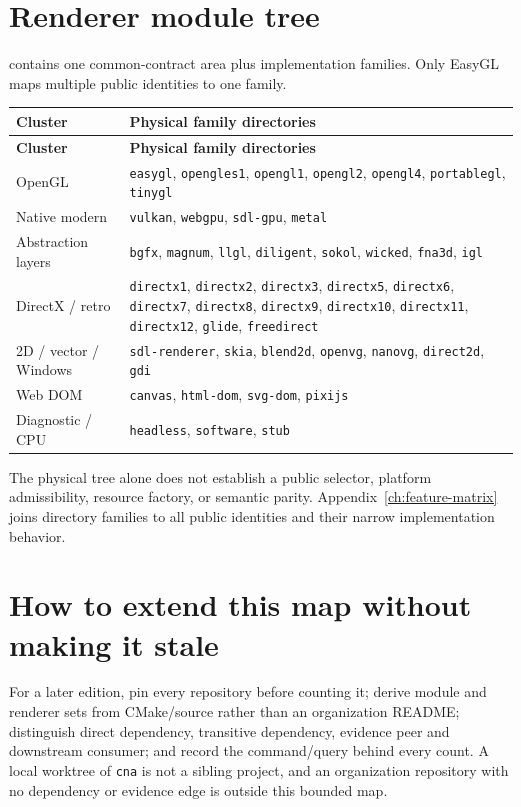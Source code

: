 \section{Renderer module tree}

 contains one common-contract area plus
\RendererFamilyCount{} implementation families.
Only EasyGL maps multiple public identities to one family.

\begin{small}
\begin{longtable}{>{\raggedright\arraybackslash}p{3.2cm}>{\raggedright\arraybackslash}p{8.2cm}}
\toprule
\textbf{Cluster} & \textbf{Physical family directories} \\
\midrule
\endfirsthead
\toprule
\textbf{Cluster} & \textbf{Physical family directories} \\
\midrule
\endhead
OpenGL & \texttt{easygl}, \texttt{opengles1}, \texttt{opengl1}, \texttt{opengl2},
  \texttt{opengl4}, \texttt{portablegl}, \texttt{tinygl} \\
Native modern & \texttt{vulkan}, \texttt{webgpu}, \texttt{sdl-gpu}, \texttt{metal} \\
Abstraction layers & \texttt{bgfx}, \texttt{magnum}, \texttt{llgl}, \texttt{diligent},
  \texttt{sokol}, \texttt{wicked}, \texttt{fna3d}, \texttt{igl} \\
DirectX / retro & \texttt{directx1}, \texttt{directx2}, \texttt{directx3},
  \texttt{directx5}, \texttt{directx6}, \texttt{directx7}, \texttt{directx8},
  \texttt{directx9}, \texttt{directx10}, \texttt{directx11}, \texttt{directx12},
  \texttt{glide}, \texttt{freedirect} \\
2D / vector / Windows & \texttt{sdl-renderer}, \texttt{skia}, \texttt{blend2d},
  \texttt{openvg}, \texttt{nanovg}, \texttt{direct2d}, \texttt{gdi} \\
Web DOM & \texttt{canvas}, \texttt{html-dom}, \texttt{svg-dom}, \texttt{pixijs} \\
Diagnostic / CPU & \texttt{headless}, \texttt{software}, \texttt{stub} \\
\bottomrule
\end{longtable}
\end{small}

The physical tree alone does not establish a public selector, platform admissibility, resource
factory, or semantic parity.  Appendix~\ref{ch:feature-matrix} joins directory families to all
\RendererIdentityCount{} public identities and their narrow implementation behavior.

\section{How to extend this map without making it stale}

For a later edition, pin every repository before counting it; derive module and renderer sets
from CMake/source rather than an organization README; distinguish direct dependency, transitive
dependency, evidence peer and downstream consumer; and record the command/query behind every
count.  A local worktree of \texttt{cna} is not a sibling project, and an organization repository
with no dependency or evidence edge is outside this bounded map.
